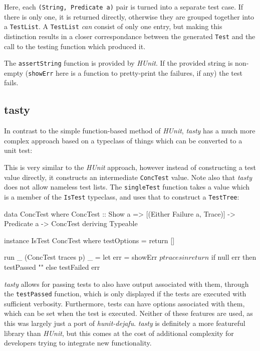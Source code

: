 Here, each \verb|(String, Predicate a)| pair is turned into a separate
test case. If there is only one, it is returned directly, otherwise
they are grouped together into a \verb|TestList|. A \verb|TestList|
\emph{can} consist of only one entry, but making this distinction
results in a closer correspondance between the generated \verb|Test|
and the call to the testing function which produced it.

The \verb|assertString| function is provided by \emph{HUnit}. If the
provided string is non-empty (\verb|showErr| here is a function to
pretty-print the failures, if any) the test fails.

\subsection{tasty}
\label{sec:practice-integration-tasty}

In contrast to the simple function-based method of \emph{HUnit},
\emph{tasty} has a much more complex approach based on a typeclass of
things which can be converted to a unit test:


This is very similar to the \emph{HUnit} approach, however instead of
constructing a test value directly, it constructs an intermediate
\verb|ConcTest| value. Note also that \emph{tasty} does not allow
nameless test lists. The \verb|singleTest| function takes a value
which is a member of the \verb|IsTest| typeclass, and uses that to
construct a \verb|TestTree|:

\begin{haskellcode}
data ConcTest where
  ConcTest :: Show a => [(Either Failure a, Trace)] -> Predicate a
    -> ConcTest
  deriving Typeable

instance IsTest ConcTest where
  testOptions = return []

  run _ (ConcTest traces p) _ =
    let err = showErr $ p traces
     in return $ if null err then testPassed "" else testFailed err
\end{haskellcode}

\emph{tasty} allows for passing tests to also have output associated
with them, through the \verb|testPassed| function, which is only
displayed if the tests are executed with sufficient
verbosity. Furthermore, tests can have options associated with them,
which can be set when the test is executed. Neither of these features
are used, as this was largely just a port of
\emph{hunit-dejafu}. \emph{tasty} is definitely a more featureful
library than \emph{HUnit}, but this comes at the cost of additional
complexity for developers trying to integrate new functionality.
